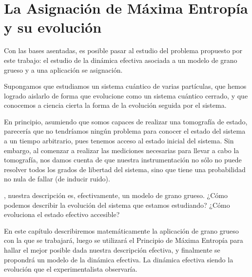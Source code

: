 \chapter{La Asignación de Máxima Entropía y su evolución}

Con las bases asentadas, es posible pasar al estudio del problema propuesto por este trabajo: el estudio de la dinámica efectiva asociada a un modelo de grano grueso y a una aplicación se asignación.

Supongamos que estudiamos un sistema cuántico de varias partículas, que hemos logrado aislarlo de forma que evolucione como un sistema cuántico cerrado, y que conocemos a ciencia cierta la forma de la evolución seguida por el sistema.

En principio, asumiendo que somos capaces de realizar una tomografía de estado, parecería que no tendríamos ningún problema para conocer el estado del sistema a un tiempo arbitrario, pues tenemos acceso al estado inicial del sistema. Sin embargo, al comenzar a realizar las mediciones necesarias para llevar a cabo la tomografía, nos damos cuenta de que nuestra instrumentación no sólo no puede resolver todos los grados de libertad del sistema, sino que tiene una probabilidad no nula de fallar (de inducir ruido).

, nuestra descripción es, efectivamente, un modelo de grano grueso. ¿Cómo podemos describir la evolución del sistema que estamos estudiando? ¿Cómo evoluciona el estado efectivo accesible?

En este capítulo describiremos matemáticamente la aplicación de grano grueso con la que se trabajará, luego se utilizará el Principio de Máxima Entropía para hallar el mejor  posible dada nuestra descripción efectiva, y finalmente se propondrá un modelo de la dinámica efectiva. La dinámica efectiva siendo la evolución que el experimentalista observaría.






\newpage

